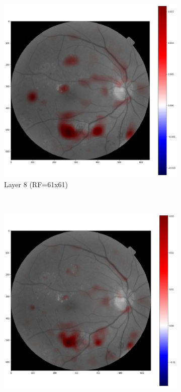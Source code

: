 \documentclass[review]{elsarticle}
\theoremstyle{definition} %
\theoremstyle{remark}
\begin{document}
\begin{figure}[!ht]
	\centering
	\begin{subfigure}{0.45\textwidth}
		\includegraphics[width=\textwidth]{./figures/maps/rf61c.png}
		\caption{Layer 8 (RF=61x61)}
		\label{fig:score_rf61}
	\end{subfigure}
	~ %
	\begin{subfigure}{0.45\textwidth}
		\includegraphics[width=\textwidth]{./figures/maps/rf45c.png}

\end{subfigure}
\end{figure}
\end{document}
